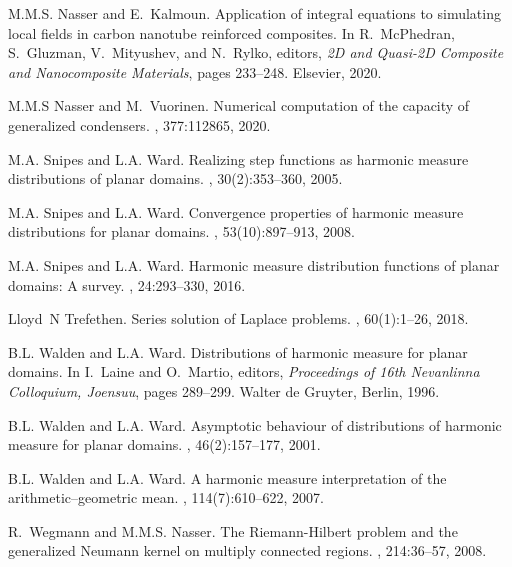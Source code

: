 \documentclass[11pt]{article}
\begin{document}
\begin{thebibliography}{10}
	M.M.S. Nasser and E.~Kalmoun.
	\newblock Application of integral equations to simulating local fields in
	carbon nanotube reinforced composites.
	\newblock In R.~McPhedran, S.~Gluzman, V.~Mityushev, and N.~Rylko, editors,
	{\em 2D and Quasi-2D Composite and Nanocomposite Materials}, pages 233--248.
	Elsevier, 2020.
	
	M.M.S Nasser and M.~Vuorinen.
	\newblock Numerical computation of the capacity of generalized condensers.
	, 377:112865, 2020.
	
	M.A. Snipes and L.A. Ward.
	\newblock Realizing step functions as harmonic measure distributions of planar
	domains.
	, 30(2):353--360, 2005.
	
	M.A. Snipes and L.A. Ward.
	\newblock Convergence properties of harmonic measure distributions for planar
	domains.
	, 53(10):897--913, 2008.
	
	M.A. Snipes and L.A. Ward.
	\newblock Harmonic measure distribution functions of planar domains: A survey.
	, 24:293--330, 2016.
	
	Lloyd~N Trefethen.
	\newblock Series solution of {L}aplace problems.
	, 60(1):1--26, 2018.
	
	B.L. Walden and L.A. Ward.
	\newblock Distributions of harmonic measure for planar domains.
	\newblock In I.~Laine and O.~Martio, editors, {\em Proceedings of 16th
		Nevanlinna Colloquium, {J}oensuu}, pages 289--299. Walter de Gruyter, Berlin,
	1996.
	
	B.L. Walden and L.A. Ward.
	\newblock Asymptotic behaviour of distributions of harmonic measure for planar
	domains.
	, 46(2):157--177,
	2001.
	
	B.L. Walden and L.A. Ward.
	\newblock A harmonic measure interpretation of the arithmetic--geometric mean.
	, 114(7):610--622, 2007.
	
	R.~Wegmann and M.M.S. Nasser.
	\newblock The {R}iemann-{H}ilbert problem and the generalized {N}eumann kernel
	on multiply connected regions.
	, 214:36--57, 2008.
	
\end{thebibliography}
\end{document}
